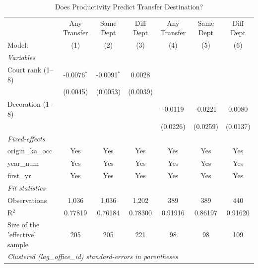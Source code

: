 \begin{table}[htbp]
\centering
\caption{Does Productivity Predict Transfer Destination?}
\label{tab:selection-productivity}
\footnotesize
\begin{threeparttable}
\begin{tabular}{lcccccc}
   \tabularnewline \midrule \midrule
                                  & Any Transfer  & Same Dept     & Diff Dept       & Any Transfer & Same Dept   & Diff Dept \\   
   Model:                         & (1)           & (2)           & (3)             & (4)          & (5)         & (6)\\  
   \midrule
   \emph{Variables}\\
   Court rank (1--8)              & -0.0076$^{*}$ & -0.0091$^{*}$ & 0.0028          &              &             &   \\   
                                  & (0.0045)      & (0.0053)      & (0.0039)        &              &             &   \\   
   Decoration (1--8)              &               &               &                 & -0.0119      & -0.0221     & 0.0080\\   
                                  &               &               &                 & (0.0226)     & (0.0259)    & (0.0137)\\   
   \midrule
   \emph{Fixed-effects}\\
   origin\_ka\_occ                & Yes           & Yes           & Yes             & Yes          & Yes         & Yes\\  
   year\_num                      & Yes           & Yes           & Yes             & Yes          & Yes         & Yes\\  
   first\_yr                      & Yes           & Yes           & Yes             & Yes          & Yes         & Yes\\  
   \midrule
   \emph{Fit statistics}\\
   Observations                   & 1,036         & 1,036         & 1,202           & 389          & 389         & 440\\  
   R$^2$                          & 0.77819       & 0.76184       & 0.78300         & 0.91916      & 0.86197     & 0.91620\\  
   Size of the 'effective' sample & 205           & 205           & 221             & 98           & 98          & 109\\  
   \midrule \midrule
   \multicolumn{7}{l}{\emph{Clustered (lag\_office\_id) standard-errors in parentheses}}\\

\end{tabular}
\end{threeparttable}
\end{table}
